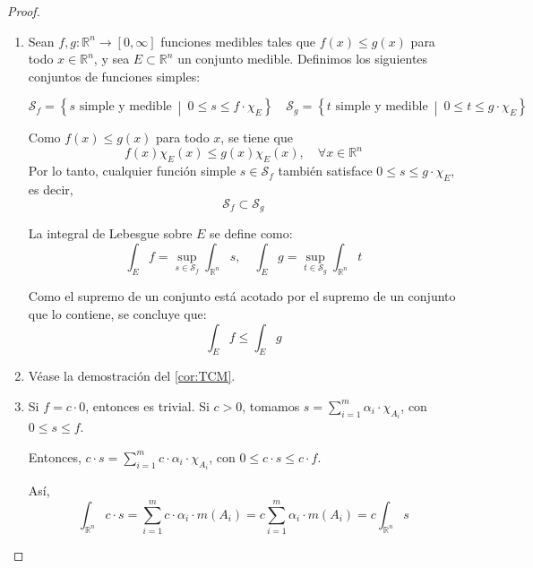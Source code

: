 \begin{proof}
    \leavevmode
    \begin{enumerate}
        \item  Sean $f, g \colon \mathbb{R}^n \to [0, \infty]$ funciones medibles tales que
              $f(x) \leq g(x)$ para todo $x \in \mathbb{R}^n$, y sea $E \subset \mathbb{R}^n$
              un conjunto medible. Definimos los siguientes conjuntos de funciones simples:

              \[
                  \mathcal{S}_f = \left\{ s \text{ simple y medible} \ \middle| \ 0 \leq s \leq f \cdot \chi_E \right\} \quad
                  \mathcal{S}_g = \left\{ t \text{ simple y medible} \ \middle| \ 0 \leq t \leq g \cdot \chi_E \right\}
              \]

              Como $f(x) \leq g(x)$ para todo $x$, se tiene que
              \[
                  f(x)\chi_E(x) \leq g(x)\chi_E(x), \quad \forall x \in \mathbb{R}^n
              \]
              Por lo tanto, cualquier función simple $s \in \mathcal{S}_f$ también satisface
              $0 \leq s \leq g \cdot \chi_E$, es decir,
              \[
                  \mathcal{S}_f \subset \mathcal{S}_g
              \]

              La integral de Lebesgue sobre $E$ se define como:
              \[
                  \int_E f = \sup_{s \in \mathcal{S}_f} \int_{\mathbb{R}^n} s, \quad
                  \int_E g = \sup_{t \in \mathcal{S}_g} \int_{\mathbb{R}^n} t
              \]

              Como el supremo de un conjunto está acotado por el supremo de un conjunto que
              lo contiene, se concluye que:
              \[
                  \int_E f \leq \int_E g
              \]

        \item  Véase la demostración del \cref{cor:TCM}.

        \item Si $f = c \cdot 0$, entonces es trivial. Si $c > 0$, tomamos $s =
                  \sum_{i=1}^{m} \alpha_i \cdot \chi_{A_i}$, con $0 \leq s \leq f$.

              Entonces, $c \cdot s = \sum_{i=1}^{m} c \cdot \alpha_i \cdot \chi_{A_i}$, con
              $0 \leq c \cdot s \leq c \cdot f$.

              Así, $$ \int_{\mathbb{R}^n} c \cdot s = \sum_{i=1}^{m} c \cdot \alpha_i \cdot
                  m(A_i) = c \sum_{i=1}^{m} \alpha_i \cdot m(A_i) = c \int_{\mathbb{R}^n} s $$


\end{enumerate}
\end{proof}
